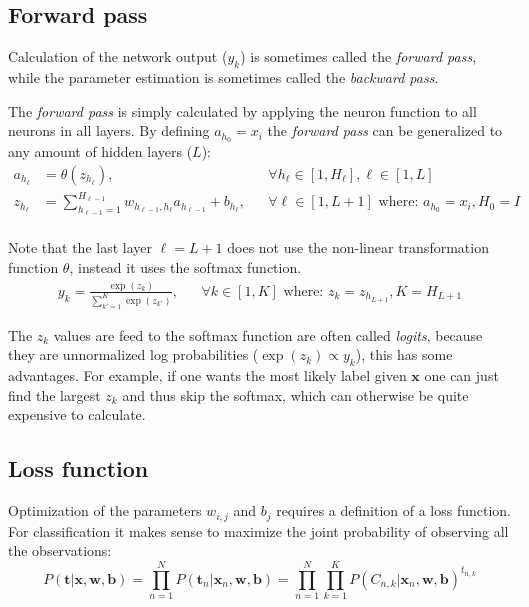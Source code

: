 \subsection{Forward pass}

Calculation of the network output ($y_k$) is sometimes called the \textit{forward pass}, while the parameter estimation is sometimes called the \textit{backward pass}.

The \textit{forward pass} is simply calculated by applying the neuron function to all neurons in all layers. By defining $a_{h_0} = x_i$ the \textit{forward pass} can be generalized to any amount of hidden layers ($L$):
\begin{equation}
\begin{aligned}
a_{h_\ell} &= \theta(z_{h_\ell}), && \forall h_{\ell} \in [1, H_{\ell}], \ell \in [1, L] \\
z_{h_\ell} &= \sum_{h_{\ell-1} = 1}^{H_{\ell-1}} w_{h_{\ell-1}, h_{\ell}} a_{h_{\ell-1}} + b_{h_{\ell}}, && \forall \ell \in [1, L+1] \text{ where: } a_{h_0} = x_i, H_0 = I \\
\end{aligned}
\end{equation}

Note that the last layer $\ell = L + 1$ does not use the non-linear transformation function $\theta$, instead it uses the softmax function.
\begin{equation}
\begin{aligned}
y_k = \frac{\exp(z_k)}{\sum_{k'=1}^K \exp(z_{k'})}, && \forall k \in [1, K] \text{ where: } z_k=z_{h_{L+1}}, K = H_{L + 1}
\end{aligned}
\label{eq:theory:ffnn:y}
\end{equation}

The $z_k$ values are feed to the softmax function are often called \textit{logits}, because they are unnormalized log probabilities ($\exp(z_k) \propto y_k$), this has some advantages. For example, if one wants the most likely label given $\mathbf{x}$ one can just find the largest $z_k$ and thus skip the softmax, which can otherwise be quite expensive to calculate.

\subsection{Loss function}

Optimization of the parameters $w_{i,j}$ and $b_{j}$ requires a definition of a loss function. For classification it makes sense to maximize the joint probability of observing all the observations:
\begin{equation}
P(\mathbf{t} | \mathbf{x}, \mathbf{w}, \mathbf{b}) = \prod_{n=1}^N P(\mathbf{t}_n | \mathbf{x}_n, \mathbf{w}, \mathbf{b})  = \prod_{n=1}^N \prod_{k=1}^K P(C_{n, k} | \mathbf{x}_n, \mathbf{w}, \mathbf{b})^{t_{n, k}}
\end{equation}

